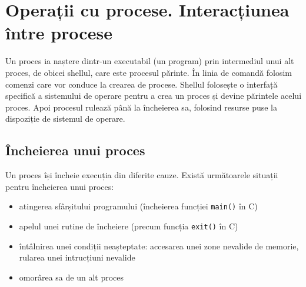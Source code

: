 
\section{Operații cu procese. Interacțiunea între procese}
\label{sec:process:operations}

Un proces ia naștere dintr-un executabil (un program) prin intermediul unui alt
proces, de obicei shellul, care este procesul părinte. În linia de comandă
folosim comenzi care vor conduce la crearea de procese. Shellul folosește o
interfață specifică a sistemului de operare pentru a crea un proces și devine
părintele acelui proces. Apoi procesul rulează până la încheierea sa, folosind
resurse puse la dispoziție de sistemul de operare.

\subsection{Încheierea unui proces}
\label{sec:process:terminate}

Un proces își încheie execuția din diferite cauze. Există următoarele situații
pentru încheierea unui proces:

\begin{itemize}
  \item atingerea sfârșitului programului (încheierea funcției \texttt{main()} în C)
  \item apelul unei rutine de încheiere (precum funcția \texttt{exit()} în C)
  \item întâlnirea unei condiții neașteptate: accesarea unei zone nevalide de memorie, rularea unei intrucțiuni nevalide
  \item omorârea sa de un alt proces
\end{itemize}

